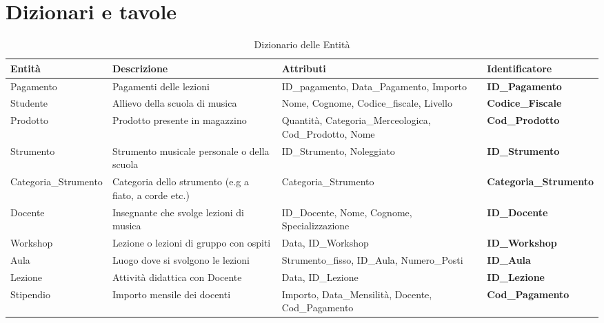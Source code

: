 \chapter{Dizionari e tavole}
\renewcommand{\arraystretch}{1.5}
\begin{xltabular}{\textwidth}{|>{\raggedright\arraybackslash}p{3cm}|>{\raggedright\arraybackslash}X|>{\raggedright\arraybackslash}X|>{\raggedright\arraybackslash}p{3.5cm}|}
    \caption{Dizionario delle Entità}
    \label{tab:dizionario} \\
    \hline
    \textbf{Entità} & \textbf{Descrizione} & \textbf{Attributi} & \textbf{Identificatore} \\
    \hline
    Pagamento & Pagamenti delle lezioni & ID\_pagamento, \newline Data\_Pagamento, Importo & \textbf{ID\_Pagamento} \\
    \hline
    Studente & Allievo della scuola di musica & Nome, Cognome, Codice\_fiscale, Livello & \textbf{Codice\_Fiscale} \\
    \hline
    Prodotto & Prodotto presente in magazzino & Quantità, \newline Categoria\_\allowbreak Merceologica, Cod\_Prodotto, Nome & \textbf{Cod\_Prodotto} \\
    \hline
    Strumento & Strumento musicale personale o della scuola & ID\_Strumento, Noleggiato & \textbf{ID\_Strumento} \\
    \hline
    Categoria\_\allowbreak Strumento & Categoria dello strumento (e.g a fiato, a corde etc.) & Categoria\_\allowbreak Strumento & \textbf{Categoria\_\allowbreak Strumento} \\
    \hline
    Docente & Insegnante che svolge lezioni di musica & ID\_Docente, Nome, Cognome, Specializzazione & \textbf{ID\_Docente} \\
    \hline
    Workshop & Lezione o lezioni di gruppo con ospiti & Data, ID\_Workshop & \textbf{ID\_Workshop} \\
    \hline
    Aula & Luogo dove si svolgono le lezioni & Strumento\_fisso, ID\_Aula, Numero\_Posti & \textbf{ID\_Aula} \\
    \hline
    Lezione & Attività didattica con Docente & Data, ID\_Lezione & \textbf{ID\_Lezione} \\
    \hline
    Stipendio & Importo mensile dei docenti & Importo, \newline Data\_Mensilità, Docente, Cod\_Pagamento & \textbf{Cod\_Pagamento} \\
    \hline
\end{xltabular}
